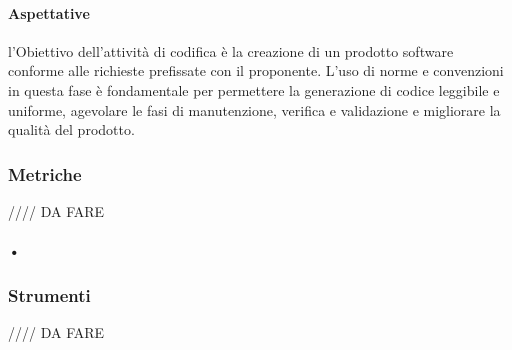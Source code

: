 \paragraph{Aspettative}

l'Obiettivo dell'attività di codifica è la creazione di un prodotto software conforme alle richieste prefissate con il proponente. L'uso di norme e convenzioni in questa fase è fondamentale per permettere la generazione di codice leggibile e uniforme, agevolare le fasi di manutenzione, verifica e validazione e migliorare la qualità del prodotto.


\subsubsection{Metriche}

//// DA FARE

\paragraph{•}

\subsubsection{Strumenti}

//// DA FARE